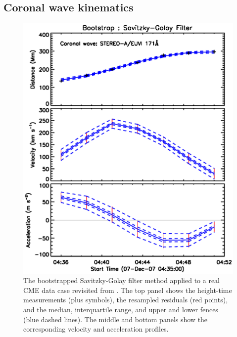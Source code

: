 \documentclass[structabstract]{aa}
\begin{document}
\subsection{Coronal wave kinematics}
\label{subsect:corpita}

\begin{figure}
\centering
\includegraphics[scale=0.6, trim=0 40 0 30]{images/fit_kinscasestudy_wave20071207.eps}
\caption{The bootstrapped Savitzky-Golay filter method applied to a real CME data case revisited from \citealt{2009A&A...495..325B}. The top panel shows the height-time measurements (plus symbols), the resampled residuals (red points), and the median, interquartile range, and upper and lower fences (blue dashed lines). The middle and bottom panels show the corresponding velocity and acceleration profiles.}
\label{fig_savgol_wave}
\end{figure}
\end{document}
